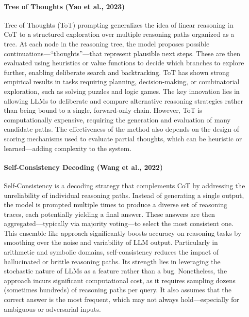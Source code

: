 \paragraph{Tree of Thoughts (Yao et al., 2023)}
Tree of Thoughts (ToT) prompting generalizes the idea of linear reasoning in CoT to a structured exploration over multiple reasoning paths organized as a tree. At each node in the reasoning tree, the model proposes possible continuations—“thoughts”—that represent plausible next steps. These are then evaluated using heuristics or value functions to decide which branches to explore further, enabling deliberate search and backtracking. ToT has shown strong empirical results in tasks requiring planning, decision-making, or combinatorial exploration, such as solving puzzles and logic games. The key innovation lies in allowing LLMs to deliberate and compare alternative reasoning strategies rather than being bound to a single, forward-only chain. However, ToT is computationally expensive, requiring the generation and evaluation of many candidate paths. The effectiveness of the method also depends on the design of scoring mechanisms used to evaluate partial thoughts, which can be heuristic or learned—adding complexity to the system.

\paragraph{Self-Consistency Decoding (Wang et al., 2022)}
Self-Consistency is a decoding strategy that complements CoT by addressing the unreliability of individual reasoning paths. Instead of generating a single output, the model is prompted multiple times to produce a diverse set of reasoning traces, each potentially yielding a final answer. These answers are then aggregated—typically via majority voting—to select the most consistent one. This ensemble-like approach significantly boosts accuracy on reasoning tasks by smoothing over the noise and variability of LLM output. Particularly in arithmetic and symbolic domains, self-consistency reduces the impact of hallucinated or brittle reasoning paths. Its strength lies in leveraging the stochastic nature of LLMs as a feature rather than a bug. Nonetheless, the approach incurs significant computational cost, as it requires sampling dozens (sometimes hundreds) of reasoning paths per query. It also assumes that the correct answer is the most frequent, which may not always hold—especially for ambiguous or adversarial inputs.


